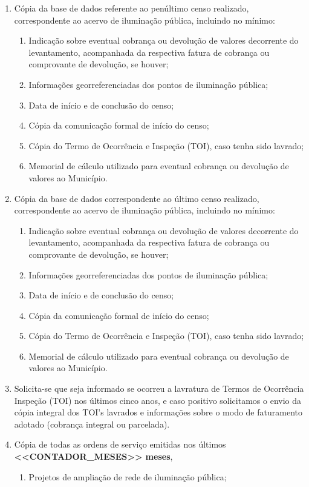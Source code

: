 \begin{enumerate}[resume]
\item Cópia da base de dados referente ao penúltimo censo realizado, correspondente ao acervo de iluminação pública, incluindo no mínimo:
\begin{enumerate}
  \item Indicação sobre eventual cobrança ou devolução de valores decorrente do levantamento, acompanhada da respectiva fatura de cobrança ou comprovante de devolução, se houver;
  \item Informações georreferenciadas dos pontos de iluminação pública;
  \item Data de início e de conclusão do censo; 
  \item Cópia da comunicação formal de início do censo;
  \item Cópia do Termo de Ocorrência e Inspeção (TOI), caso tenha sido lavrado;
  \item Memorial de cálculo utilizado para eventual cobrança ou devolução de valores ao Município. 
\end{enumerate}
\item Cópia da base de dados correspondente ao último censo realizado, correspondente ao acervo de iluminação pública, incluindo no mínimo: 
\begin{enumerate}
  \item Indicação sobre eventual cobrança ou devolução de valores decorrente do levantamento, acompanhada da respectiva fatura de cobrança ou comprovante de devolução, se houver; 
  \item Informações georreferenciadas dos pontos de iluminação pública;
  \item Data de início e de conclusão do censo;
  \item Cópia da comunicação formal de início do censo; 
  \item Cópia do Termo de Ocorrência e Inspeção (TOI), caso tenha sido lavrado;
  \item Memorial de cálculo utilizado para eventual cobrança ou devolução de valores ao Município. 
\end{enumerate}
\item Solicita-se que seja informado se ocorreu a lavratura de Termos de Ocorrência Inspeção (TOI) nos últimos cinco anos, e caso positivo solicitamos o envio da cópia integral dos TOI’s lavrados e informações sobre o modo de faturamento adotado (cobrança integral ou parcelada).
\item Cópia de todas as ordens de serviço emitidas nos últimos \textbf{<<CONTADOR_MESES>> meses},
\begin{enumerate}
  \item Projetos de ampliação de rede de iluminação pública;
\end{enumerate}
\end{enumerate}